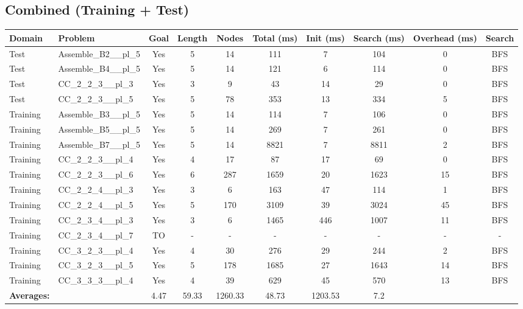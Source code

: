 \documentclass{article}
\begin{document}
\subsection*{Combined (Training + Test)}
\begin{tabular}{llcccccccc}
\toprule
Domain & Problem & Goal & Length & Nodes & Total (ms) & Init (ms) & Search (ms) & Overhead (ms) & Search \\
\midrule
Test & Assemble\_B2\_\_pl\_5 & Yes & 5 & 14 & 111 & 7 & 104 & 0 & BFS \\
Test & Assemble\_B4\_\_pl\_5 & Yes & 5 & 14 & 121 & 6 & 114 & 0 & BFS \\
Test & CC\_2\_2\_3\_\_pl\_3 & Yes & 3 & 9 & 43 & 14 & 29 & 0 & BFS \\
Test & CC\_2\_2\_3\_\_pl\_5 & Yes & 5 & 78 & 353 & 13 & 334 & 5 & BFS \\
Training & Assemble\_B3\_\_pl\_5 & Yes & 5 & 14 & 114 & 7 & 106 & 0 & BFS \\
Training & Assemble\_B5\_\_pl\_5 & Yes & 5 & 14 & 269 & 7 & 261 & 0 & BFS \\
Training & Assemble\_B7\_\_pl\_5 & Yes & 5 & 14 & 8821 & 7 & 8811 & 2 & BFS \\
Training & CC\_2\_2\_3\_\_pl\_4 & Yes & 4 & 17 & 87 & 17 & 69 & 0 & BFS \\
Training & CC\_2\_2\_3\_\_pl\_6 & Yes & 6 & 287 & 1659 & 20 & 1623 & 15 & BFS \\
Training & CC\_2\_2\_4\_\_pl\_3 & Yes & 3 & 6 & 163 & 47 & 114 & 1 & BFS \\
Training & CC\_2\_2\_4\_\_pl\_5 & Yes & 5 & 170 & 3109 & 39 & 3024 & 45 & BFS \\
Training & CC\_2\_3\_4\_\_pl\_3 & Yes & 3 & 6 & 1465 & 446 & 1007 & 11 & BFS \\
Training & CC\_2\_3\_4\_\_pl\_7 & TO & - & - & - & - & - & - & - \\
Training & CC\_3\_2\_3\_\_pl\_4 & Yes & 4 & 30 & 276 & 29 & 244 & 2 & BFS \\
Training & CC\_3\_2\_3\_\_pl\_5 & Yes & 5 & 178 & 1685 & 27 & 1643 & 14 & BFS \\
Training & CC\_3\_3\_3\_\_pl\_4 & Yes & 4 & 39 & 629 & 45 & 570 & 13 & BFS \\
\textbf{Averages:} & & 4.47 & 59.33 & 1260.33 & 48.73 & 1203.53 & 7.2 & \\
\bottomrule
\end{tabular}
\newpage
\end{document}
